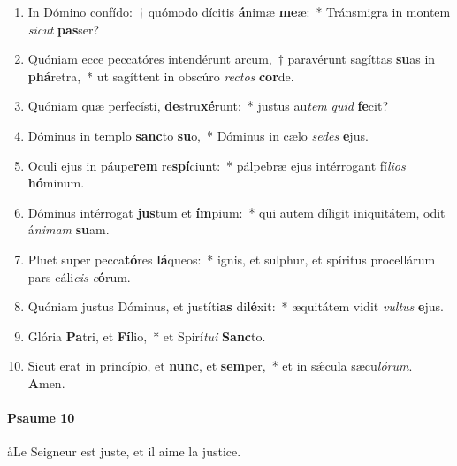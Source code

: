 \documentclass[twoside]{article}
\begin{document}
\begin{paracol}[1]{2}
\begin{enumerate}[wide, itemsep=0mm, labelwidth=!, labelindent=0pt, label=\color{gregoriocolor}\theenumi]
\item In Dómino confído:~† quómodo dícitis \textbf{á}nimæ \textbf{me}æ:~* Tránsmigra in montem \textit{sic}\textit{ut} \textbf{pas}ser?
\item Quóniam ecce peccatóres intendérunt arcum,~† paravérunt sagíttas \textbf{su}as in \textbf{phá}retra,~* ut sagíttent in obscúro \textit{rec}\textit{tos} \textbf{cor}de.
\item Quóniam quæ perfecísti, \textbf{de}stru\textbf{xé}runt:~* justus au\textit{tem} \textit{quid} \textbf{fe}cit?
\item Dóminus in templo \textbf{sanc}to \textbf{su}o,~* Dóminus in cælo \textit{se}\textit{des} \textbf{e}jus.
\item Oculi ejus in páupe\textbf{rem} re\textbf{spí}ciunt:~* pálpebræ ejus intérrogant fí\textit{li}\textit{os} \textbf{hó}minum.
\item Dóminus intérrogat \textbf{jus}tum et \textbf{ím}pium:~* qui autem díligit iniquitátem, odit á\textit{ni}\textit{mam} \textbf{su}am.
\item Pluet super pecca\textbf{tó}res \textbf{lá}queos:~* ignis, et sulphur, et spíritus procellárum pars cáli\textit{cis} \textit{e}\textbf{ó}rum.
\item Quóniam justus Dóminus, et justíti\textbf{as} di\textbf{lé}xit:~* æquitátem vidit \textit{vul}\textit{tus} \textbf{e}jus.
\item Glória \textbf{Pa}tri, et \textbf{Fí}lio,~* et Spirí\textit{tu}\textit{i} \textbf{Sanc}to.
\item Sicut erat in princípio, et \textbf{nunc}, et \textbf{sem}per,~* et in sǽcula sæcu\textit{ló}\textit{rum}. \textbf{A}men.
\end{enumerate}

\switchcolumn

\paragraph{Psaume 10}
\aa Le Seigneur est juste, et il aime la justice.



\end{paracol}
\end{document}
